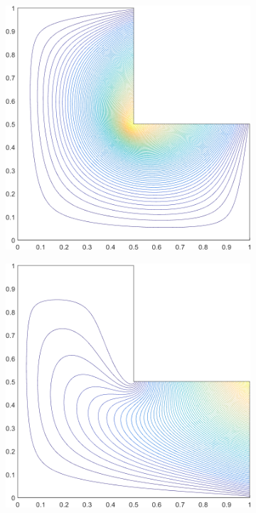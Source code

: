 \begin{figure}
\begin{subfigure}[b]{0.39\textwidth}
		\caption{}
	\end{subfigure}
	\vfill
	\begin{subfigure}[b]{0.39\textwidth}
		\centering
		\includegraphics[width=\textwidth]{figures/sec_BF/L-domain_MAXENT1_contour_b4.png}
		\caption{}
	\end{subfigure}
	\hspace{1.5cm}
	\begin{subfigure}[b]{0.39\textwidth}
		\centering
		\includegraphics[width=\textwidth]{figures/sec_BF/L-domain_MAXENT1_contour_b3.png}

\end{subfigure}
\end{figure}
